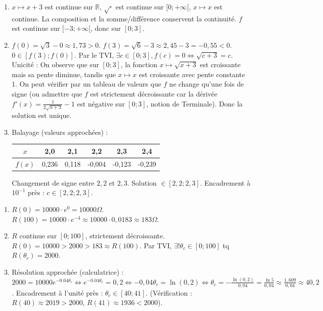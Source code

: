 \documentclass[11pt]{article}
\begin{document}
\begin{corrige}[Exercice 2]
\begin{enumerate}
    \item $x \mapsto x+3$ est continue sur $\mathbb{R}$, $\sqrt{\cdot}$ est continue sur $[0;+\infty[$, $x \mapsto x$ est continue. La composition et la somme/différence conservent la continuité. $f$ est continue sur $[-3;+\infty[$, donc sur $[0;3]$.
    \item $f(0) = \sqrt{3} - 0 \approx 1,73 > 0$. $f(3) = \sqrt{6} - 3 \approx 2,45 - 3 = -0,55 < 0$.
    $0 \in [f(3); f(0)]$. Par le TVI, $\exists c \in [0;3], f(c)=0 \iff \sqrt{c+3}=c$.
    Unicité : On observe que sur $[0;3]$, la fonction $x \mapsto \sqrt{x+3}$ est croissante mais sa pente diminue, tandis que $x \mapsto x$ est croissante avec pente constante 1. On peut vérifier par un tableau de valeurs que $f$ ne change qu'une fois de signe (ou admettre que $f$ est strictement décroissante car la dérivée $f'(x) = \frac{1}{2\sqrt{x+3}} - 1$ est négative sur $[0;3]$, notion de Terminale). Donc la solution est unique.
    \item Balayage (valeurs approchées) :
    \begin{center}
    \begin{tabular}{|c|c|c|c|c|c|}\hline
    $x$ & 2,0 & 2,1 & 2,2 & 2,3 & 2,4 \\ \hline
    $f(x)$ & 0,236 & 0,118 & -0,004 & -0,123 & -0,239 \\ \hline
    \end{tabular}
    \end{center}
    Changement de signe entre $2,2$ et $2,3$. Solution $\in [2,2 ; 2,3]$.
    Encadrement à $10^{-1}$ près : $c \in [2,2 ; 2,3]$.
\end{enumerate}
\end{corrige}

\begin{corrige}[Exercice 3]
\begin{enumerate}
    \item $R(0) = 10000 \cdot e^0 = 10000 \Omega$. $R(100) = 10000 \cdot e^{-4} \approx 10000 \cdot 0,0183 \approx 183 \Omega$.
    \item $R$ continue sur $[0;100]$, strictement décroissante. $R(0)=10000 > 2000 > 183 \approx R(100)$.
    Par TVI, $\exists ! \theta_c \in [0;100]$ tq $R(\theta_c)=2000$.
    \item Résolution approchée (calculatrice) : $2000 = 10000 e^{-0.04\theta_c} \iff e^{-0.04\theta_c} = 0,2 \iff -0,04\theta_c = \ln(0,2) \iff \theta_c = -\frac{\ln(0,2)}{0,04} = \frac{\ln 5}{0,04} \approx \frac{1,609}{0,04} \approx 40,2$.
    Encadrement à l'unité près : $\theta_c \in [40 ; 41]$.
    (Vérification : $R(40) \approx 2019 > 2000$, $R(41) \approx 1936 < 2000$).
\end{enumerate}
\end{corrige}
\end{document}
